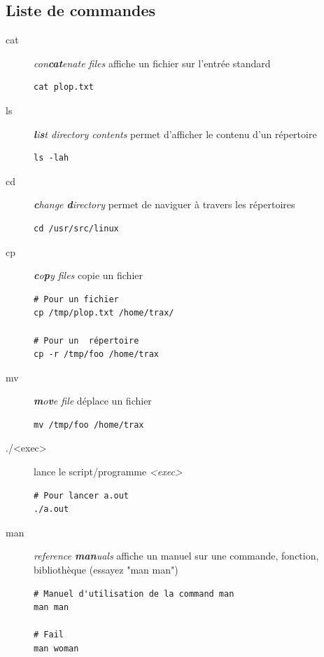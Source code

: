 \documentclass[french, a4paper, 12pt, titlepage]{article}
\begin{document}
\subsection{Liste de commandes}
\begin{description}
\item[cat] \emph{con\textbf{cat}enate files} affiche un fichier sur l'entrée standard
  \begin{lstlisting}
cat plop.txt
  \end{lstlisting}
\item[ls] \emph{\textbf{l}i\textbf{s}t directory contents} permet d'afficher le contenu d'un répertoire
  \begin{lstlisting}
ls -lah 
  \end{lstlisting}
\item[cd] \emph{\textbf{c}hange \textbf{d}irectory} permet de naviguer à travers les répertoires
  \begin{lstlisting}
cd /usr/src/linux    
  \end{lstlisting}
\item[cp] \emph{\textbf{c}o\textbf{p}y files} copie un fichier
  \begin{lstlisting}
# Pour un fichier
cp /tmp/plop.txt /home/trax/

# Pour un  répertoire
cp -r /tmp/foo /home/trax
  \end{lstlisting}
\item[mv] \emph{\textbf{m}o\textbf{v}e file} déplace un fichier
  \begin{lstlisting}
mv /tmp/foo /home/trax    
  \end{lstlisting}
\item[./<exec>] lance le script/programme \emph{<exec>}
  \begin{lstlisting}
# Pour lancer a.out
./a.out    
  \end{lstlisting}
\item[man] \emph{reference \textbf{man}uals} affiche un manuel sur une commande, fonction, bibliothèque (essayez "man man")
  \begin{lstlisting}
# Manuel d'utilisation de la command man
man man

# Fail
man woman
  \end{lstlisting}
\end{description}








\newpage
\end{document}
